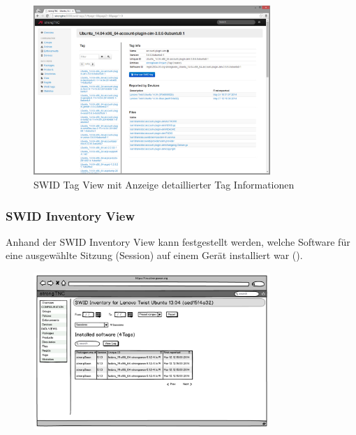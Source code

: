 \begin{figure}[H]
\centering
\includegraphics[width=0.8\textwidth]{./images/Views/tag-detail-view}
\caption{SWID Tag View mit Anzeige detaillierter Tag Informationen}
\label{fig:tag-detail-view}
\end{figure}

\subsubsection{SWID Inventory View}

Anhand der SWID Inventory View kann festgestellt werden, welche Software für eine ausgewählte Sitzung (Session) auf einem Gerät installiert war ().

\begin{figure}[H]
\centering
\includegraphics[width=0.8\textwidth]{./images/mockups/swid-inventory}
\caption{}
\label{fig:swid-inventory}
\end{figure}

